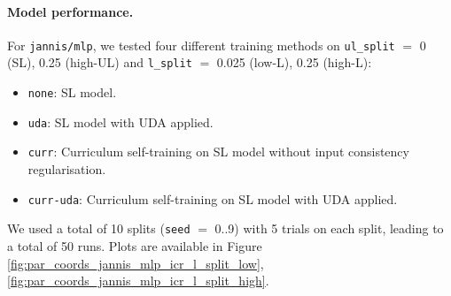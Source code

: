\documentclass{article}
\begin{document}
\paragraph{Model performance.}
For \texttt{jannis/mlp}, we tested four different training methods on \texttt{ul\_split}
$=$ 0 (SL), 0.25 (high-UL) and \texttt{l\_split} $=$ 0.025 (low-L), 0.25 (high-L):
\begin{itemize}
  \item \texttt{none}: SL model.
  \item \texttt{uda}: SL model with UDA applied.
  \item \texttt{curr}: Curriculum self-training on SL model without input consistency
  regularisation.
  \item \texttt{curr-uda}: Curriculum self-training on SL model with UDA applied.
\end{itemize}
We used a total of 10 splits (\texttt{seed} $=$ 0..9) with 5 trials on each split,
leading to a total of 50 runs.
Plots are available in Figure \ref{fig:par_coords_jannis_mlp_icr_l_split_low},
\ref{fig:par_coords_jannis_mlp_icr_l_split_high}.
\end{document}

